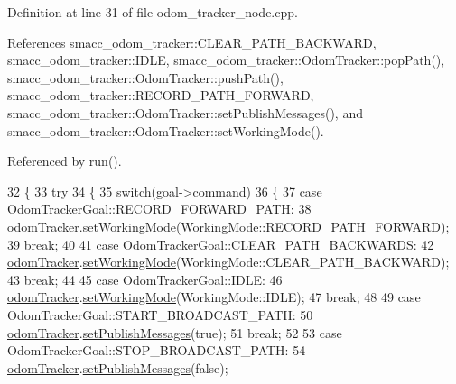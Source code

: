 Definition at line 31 of file odom\+\_\+tracker\+\_\+node.\+cpp.



References smacc\+\_\+odom\+\_\+tracker\+::\+C\+L\+E\+A\+R\+\_\+\+P\+A\+T\+H\+\_\+\+B\+A\+C\+K\+W\+A\+RD, smacc\+\_\+odom\+\_\+tracker\+::\+I\+D\+LE, smacc\+\_\+odom\+\_\+tracker\+::\+Odom\+Tracker\+::pop\+Path(), smacc\+\_\+odom\+\_\+tracker\+::\+Odom\+Tracker\+::push\+Path(), smacc\+\_\+odom\+\_\+tracker\+::\+R\+E\+C\+O\+R\+D\+\_\+\+P\+A\+T\+H\+\_\+\+F\+O\+R\+W\+A\+RD, smacc\+\_\+odom\+\_\+tracker\+::\+Odom\+Tracker\+::set\+Publish\+Messages(), and smacc\+\_\+odom\+\_\+tracker\+::\+Odom\+Tracker\+::set\+Working\+Mode().



Referenced by run().


\begin{DoxyCode}
32 \{
33   \textcolor{keywordflow}{try}
34   \{
35     \textcolor{keywordflow}{switch}(goal->command)
36     \{
37       \textcolor{keywordflow}{case} OdomTrackerGoal::RECORD\_FORWARD\_PATH: 
38         \hyperlink{classOdomTrackerActionServer_a3e5c4328d3206fbd2fd2708f0aefe651}{odomTracker}.\hyperlink{classsmacc__odom__tracker_1_1OdomTracker_a38fbca999297c46dc95628cc60851a45}{setWorkingMode}(WorkingMode::RECORD\_PATH\_FORWARD);
39       \textcolor{keywordflow}{break};
40 
41       \textcolor{keywordflow}{case} OdomTrackerGoal::CLEAR\_PATH\_BACKWARDS:
42         \hyperlink{classOdomTrackerActionServer_a3e5c4328d3206fbd2fd2708f0aefe651}{odomTracker}.\hyperlink{classsmacc__odom__tracker_1_1OdomTracker_a38fbca999297c46dc95628cc60851a45}{setWorkingMode}(WorkingMode::CLEAR\_PATH\_BACKWARD);
43       \textcolor{keywordflow}{break};
44 
45       \textcolor{keywordflow}{case} OdomTrackerGoal::IDLE:
46         \hyperlink{classOdomTrackerActionServer_a3e5c4328d3206fbd2fd2708f0aefe651}{odomTracker}.\hyperlink{classsmacc__odom__tracker_1_1OdomTracker_a38fbca999297c46dc95628cc60851a45}{setWorkingMode}(WorkingMode::IDLE);
47       \textcolor{keywordflow}{break};
48 
49       \textcolor{keywordflow}{case} OdomTrackerGoal::START\_BROADCAST\_PATH:
50         \hyperlink{classOdomTrackerActionServer_a3e5c4328d3206fbd2fd2708f0aefe651}{odomTracker}.\hyperlink{classsmacc__odom__tracker_1_1OdomTracker_a5808c41a9d8d75a70ec66fa581af4570}{setPublishMessages}(\textcolor{keyword}{true});
51       \textcolor{keywordflow}{break};
52 
53       \textcolor{keywordflow}{case} OdomTrackerGoal::STOP\_BROADCAST\_PATH:
54         \hyperlink{classOdomTrackerActionServer_a3e5c4328d3206fbd2fd2708f0aefe651}{odomTracker}.\hyperlink{classsmacc__odom__tracker_1_1OdomTracker_a5808c41a9d8d75a70ec66fa581af4570}{setPublishMessages}(\textcolor{keyword}{false});

\end{DoxyCode}
